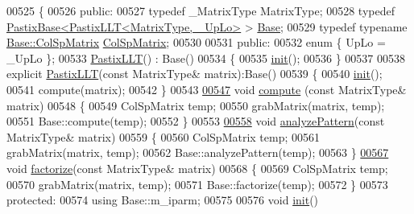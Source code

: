 \begin{DoxyCode}
00525 \{
00526   \textcolor{keyword}{public}:
00527     \textcolor{keyword}{typedef} \_MatrixType MatrixType;
00528     \textcolor{keyword}{typedef} \hyperlink{class_eigen_1_1_pastix_base}{PastixBase<PastixLLT<MatrixType, \_UpLo>} > 
      \hyperlink{class_eigen_1_1_pastix_base}{Base};
00529     \textcolor{keyword}{typedef} \textcolor{keyword}{typename} \hyperlink{group___sparse_core___module}{Base::ColSpMatrix} \hyperlink{group___sparse_core___module}{ColSpMatrix};
00530     
00531   \textcolor{keyword}{public}:
00532     \textcolor{keyword}{enum} \{ UpLo = \_UpLo \};
00533     \hyperlink{class_eigen_1_1_pastix_l_l_t}{PastixLLT}() : Base()
00534     \{
00535       \hyperlink{structinit}{init}();
00536     \}
00537     
00538     \textcolor{keyword}{explicit} \hyperlink{class_eigen_1_1_pastix_l_l_t}{PastixLLT}(\textcolor{keyword}{const} MatrixType& matrix):Base()
00539     \{
00540       \hyperlink{structinit}{init}();
00541       compute(matrix);
00542     \}
00543 
\hyperlink{class_eigen_1_1_pastix_l_l_t_a54fcdef53903851e2d8113a6ed330b5c}{00547}     \textcolor{keywordtype}{void} \hyperlink{class_eigen_1_1_pastix_l_l_t_a54fcdef53903851e2d8113a6ed330b5c}{compute} (\textcolor{keyword}{const} MatrixType& matrix)
00548     \{
00549       ColSpMatrix temp;
00550       grabMatrix(matrix, temp);
00551       Base::compute(temp);
00552     \}
00553 
\hyperlink{class_eigen_1_1_pastix_l_l_t_a671e8444ae2f04db3565e35caa958667}{00558}     \textcolor{keywordtype}{void} \hyperlink{class_eigen_1_1_pastix_l_l_t_a671e8444ae2f04db3565e35caa958667}{analyzePattern}(\textcolor{keyword}{const} MatrixType& matrix)
00559     \{
00560       ColSpMatrix temp;
00561       grabMatrix(matrix, temp);
00562       Base::analyzePattern(temp);
00563     \}
\hyperlink{class_eigen_1_1_pastix_l_l_t_a63dac317804b18a4704a519d7bdfaaff}{00567}     \textcolor{keywordtype}{void} \hyperlink{class_eigen_1_1_pastix_l_l_t_a63dac317804b18a4704a519d7bdfaaff}{factorize}(\textcolor{keyword}{const} MatrixType& matrix)
00568     \{
00569       ColSpMatrix temp;
00570       grabMatrix(matrix, temp);
00571       Base::factorize(temp);
00572     \}
00573   \textcolor{keyword}{protected}:
00574     \textcolor{keyword}{using} Base::m\_iparm;
00575     
00576     \textcolor{keywordtype}{void} \hyperlink{structinit}{init}()

\end{DoxyCode}
